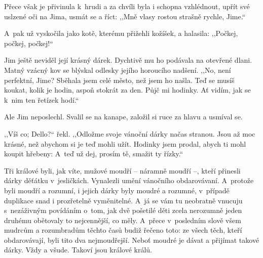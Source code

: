 Přece však je přivinula k hrudi a za chvíli byla i schopna vzhlédnout, upřít své uslzené oči na Jima, usmát se a říct: ,,Mně vlasy rostou strašně rychle, Jime.``

A~pak už vyskočila jako kotě, kterému přižehli kožíšek, a halasila: ,,Počkej, počkej, počkej!``

Jim ještě neviděl její krásný dárek. Dychtivě mu ho podávala na otevřené dlani. Matný vzácný kov se blýskal odlesky jejího horoucího nadšení.
,,No, není perfektní, Jime? Sběhala jsem celé město, než jsem ho našla. Teď se musíš koukat, kolik je hodin, aspoň stokrát za den. Půjč mi hodinky. Ať vidím, jak se k nim ten řetízek hodí.``

Ale Jim neposlechl. Svalil se na kanape, založil si ruce za hlavu a usmíval se.

,,Víš co; Dello?`` řekl. ,,Odložme svoje vánoční dárky načas stranou. Jsou až moc krásné, než abychom si je teď mohli užít. Hodinky jsem prodal, abych ti mohl koupit hřebeny: A~teď už dej, prosím tě, smažit ty řízky.``

Tři králové byli, jak víte, mužové moudří -- náramně moudří --, kteří přinesli dárky děťátku v jesličkách. Vynalezli umění vánočního obdarovávaní. A~protože byli moudří a rozumní, i jejich dárky byly moudré a rozumné, v případě duplikace snad i prozřetelně vyměnitelné. A~já se vám tu neobratně vnucuju s nezáživným povídáním o~tom, jak dvě pošetilé děti zcela nerozumně jeden druhému obětovaly to nejcennější, co měly. A~přece v posledním slově všem mudrcům a rozumbradům těchto časů budiž řečeno toto: ze všech těch, kteří obdarovávají, byli tito dva nejmoudřejší. Neboť moudré je dávat a přijímat takové dárky. Vždy a všude. Takoví jsou králové králů.


